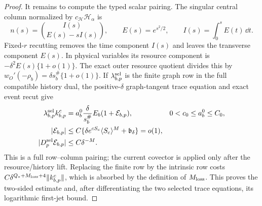 \begin{proof}
It remains to compute the typed scalar pairing.  The singular central
column normalized by \(c_{\mathscr H}\mathscr H_\alpha\) is
\[
 n(s)=\binom{I(s)}{E(s)-sI(s)},\qquad
 E(s)=e^{s^2/2},\qquad I(s)=\int_0^sE(t)\,\dd t.
\]
Fixed-\(r\) recutting removes the time component \(I(s)\) and leaves the
transverse component \(E(s)\).  In physical variables its resource
component is \(-\delta^2E(s)\{1+o(1)\}\).  The exact outer resource
quotient divides this by
\(w_O'(-\rho_b)=\delta s_b^\#\{1+o(1)\}\).  If
\(\lambda_{b,p}^{\rm sel}\) is the finite graph row in the full compatible
history dual, the positive-\(\delta\) graph-tangent trace equation and exact
event recut give
\begin{equation}
 \begin{aligned}
  \lambda_{b,p}^{\rm sel}k_{b,p}^c
  &=a_b^0\frac{\delta}{s_b^\#}E_b(1+\mathcal E_{b,p}),
      &0<c_0&\le a_b^0\le C_0,\\
  |\mathcal E_{b,p}|
  &\le C\{\delta e^{cS_c}\langle S_c\rangle^M
               +\mathfrak b_\delta\}=o(1),\\
  |D_p^{\rm sel}\mathcal E_{b,p}|&\le C\delta^{-M}.
 \end{aligned}
 \label{eq:lean-anchor-projective-relative-ledger}
\end{equation}
This is a full row--column pairing; the current covector is applied only
after the resource/history lift.  Replacing the finite row by the intrinsic
row costs
\(C\delta^{Q_*+M_{\rm loss}+4}\|k_{b,p}^c\|\), which is absorbed by the
definition of \(M_{\rm loss}\).
This proves the two-sided estimate and, after differentiating the two
selected trace equations, its logarithmic first-jet bound.
\end{proof}


